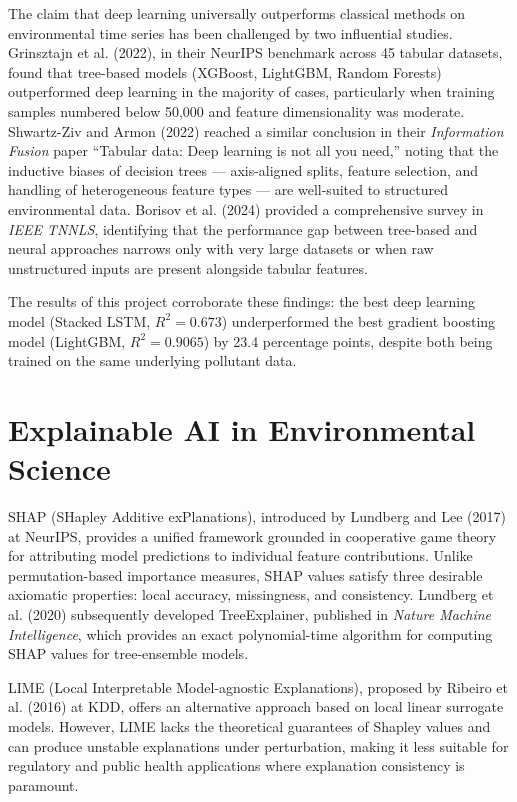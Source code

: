 \documentclass[12pt,a4paper]{report}
\begin{document}
The claim that deep learning universally outperforms classical methods on environmental time series has been challenged by two influential studies. Grinsztajn et al. (2022), in their NeurIPS benchmark across 45 tabular datasets, found that tree-based models (XGBoost, LightGBM, Random Forests) outperformed deep learning in the majority of cases, particularly when training samples numbered below 50,000 and feature dimensionality was moderate. Shwartz-Ziv and Armon (2022) reached a similar conclusion in their \textit{Information Fusion} paper ``Tabular data: Deep learning is not all you need,'' noting that the inductive biases of decision trees --- axis-aligned splits, feature selection, and handling of heterogeneous feature types --- are well-suited to structured environmental data. Borisov et al. (2024) provided a comprehensive survey in \textit{IEEE TNNLS}, identifying that the performance gap between tree-based and neural approaches narrows only with very large datasets or when raw unstructured inputs are present alongside tabular features.

The results of this project corroborate these findings: the best deep learning model (Stacked LSTM, $R^2 = 0.673$) underperformed the best gradient boosting model (LightGBM, $R^2 = 0.9065$) by 23.4 percentage points, despite both being trained on the same underlying pollutant data.

\section{Explainable AI in Environmental Science}

SHAP (SHapley Additive exPlanations), introduced by Lundberg and Lee (2017) at NeurIPS, provides a unified framework grounded in cooperative game theory for attributing model predictions to individual feature contributions. Unlike permutation-based importance measures, SHAP values satisfy three desirable axiomatic properties: local accuracy, missingness, and consistency. Lundberg et al. (2020) subsequently developed TreeExplainer, published in \textit{Nature Machine Intelligence}, which provides an exact polynomial-time algorithm for computing SHAP values for tree-ensemble models.

LIME (Local Interpretable Model-agnostic Explanations), proposed by Ribeiro et al. (2016) at KDD, offers an alternative approach based on local linear surrogate models. However, LIME lacks the theoretical guarantees of Shapley values and can produce unstable explanations under perturbation, making it less suitable for regulatory and public health applications where explanation consistency is paramount.
\end{document}
